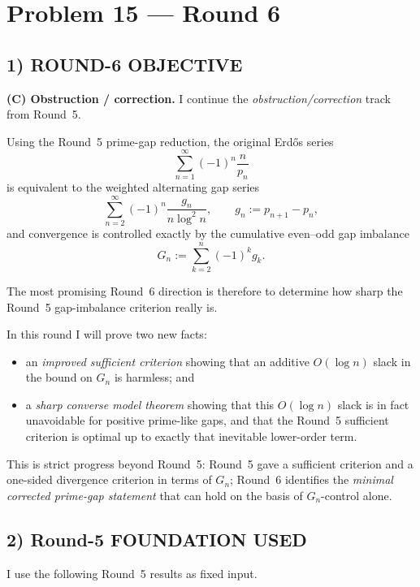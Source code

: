 \section{Problem 15 --- Round 6}

\subsection*{1) ROUND-6 OBJECTIVE}

\textbf{(C) Obstruction / correction.}
I continue the \emph{obstruction/correction} track from Round~5.

Using the Round~5 prime-gap reduction, the original Erd\H{o}s series
\[
\sum_{n=1}^\infty (-1)^n \frac{n}{p_n}
\]
is equivalent to the weighted alternating gap series
\[
\sum_{n=2}^\infty (-1)^n \frac{g_n}{n\log^2 n},
\qquad g_n:=p_{n+1}-p_n,
\]
and convergence is controlled exactly by the cumulative even--odd gap imbalance
\[
G_n:=\sum_{k=2}^n (-1)^k g_k.
\]

The most promising Round~6 direction is therefore to determine how sharp the Round~5 gap-imbalance criterion really is.

In this round I will prove two new facts:

\begin{itemize}
\item an \emph{improved sufficient criterion} showing that an additive \(O(\log n)\) slack in the bound on \(G_n\) is harmless; and
\item a \emph{sharp converse model theorem} showing that this \(O(\log n)\) slack is in fact unavoidable for positive prime-like gaps, and that the Round~5 sufficient criterion is optimal up to exactly that inevitable lower-order term.
\end{itemize}

This is strict progress beyond Round~5:
Round~5 gave a sufficient criterion and a one-sided divergence criterion in terms of \(G_n\);
Round~6 identifies the \emph{minimal corrected prime-gap statement} that can hold on the basis of \(G_n\)-control alone.

\subsection*{2) Round-5 FOUNDATION USED}

I use the following Round~5 results as fixed input.

